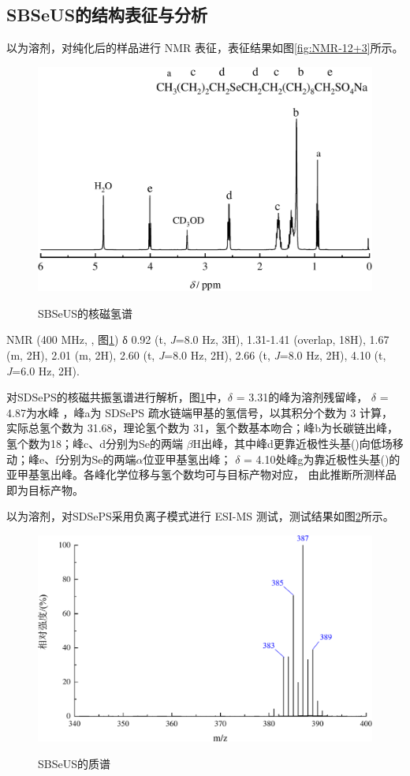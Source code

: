 \documentclass[bachelor,fandolfonts,replaceperiod]{jnuthesis}
\begin{document}
    \subsection{SBSeUS的结构表征与分析}
        以为溶剂，对纯化后的样品进行     NMR 表征，表征结果如图\ref{fig:NMR-12+3}所示。
    \begin{figure}[htbp]
        \centering
        \includegraphics[width=.75\textwidth]{figure/SBSeUS-nmr.pdf}\\
        \caption{SBSeUS的核磁氢谱}\label{fig:SBSeUS-nmr}
    \end{figure}
    
     NMR (400 MHz, , 图\ref{fig:SBSeUS-nmr}) δ 0.92 (t, \textit{J}=8.0 Hz, 3H), 1.31-1.41 (overlap, 18H), 
    1.67 (m, 2H), 2.01 (m, 2H), 2.60 (t, \textit{J}=8.0 Hz, 2H), 2.66 (t, \textit{J}=8.0 Hz, 2H),  4.10 (t, \textit{J}=6.0 Hz, 2H).
    
    对SDSePS的核磁共振氢谱进行解析，图\ref{fig:SBSeUS-nmr}中，$\delta$ = 3.31的峰为溶剂残留峰，
    $\delta$ = 4.87为水峰\cite{波谱解析} ，峰a为 SDSePS 疏水链端甲基的氢信号，以其积分个数为 3 计算，
    实际总氢个数为 31.68，理论氢个数为 31，氢个数基本吻合；峰b为长碳链出峰，氢个数为18；峰c、d分别为Se的两端
    $\beta$H出峰，其中峰d更靠近极性头基()向低场移动；峰e、f分别为Se的两端$\alpha$位亚甲基氢出峰；
    $\delta$ = 4.10处峰g为靠近极性头基()的亚甲基氢出峰。各峰化学位移与氢个数均可与目标产物对应，
    由此推断所测样品即为目标产物。
    
    以为溶剂，对SDSePS采用负离子模式进行 ESI-MS 测试，测试结果如图\ref{fig:SBSeUS-mass}所示。
    \begin{figure}[htbp]
        \centering
        \includegraphics[width=.8\textwidth]{figure/SBSeUS-mass.pdf}\\
        \caption{SBSeUS的质谱}\label{fig:SBSeUS-mass}
    \end{figure}
    
\end{document}
